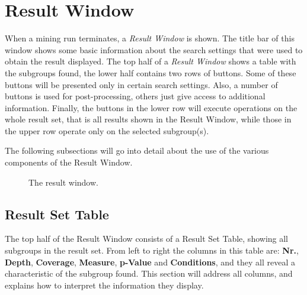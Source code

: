 \documentclass{article}
\begin{document}
\section{Result Window}
\label{section:result-window}
When a mining run terminates, a \emph{Result Window} is shown.
The title bar of this window shows some basic information about the search settings that were used to obtain the result displayed.
The top half of a \emph{Result Window} shows a table with the subgroups found, the lower half contains two rows of buttons.
Some of these buttons will be presented only in certain search settings.
Also, a number of buttons is used for post-processing, others just give access to additional information.
Finally, the buttons in the lower row will execute operations on the whole result set, that is all results shown in the Result Window, while those in the upper row operate only on the selected subgroup(s).

The following subsections will go into detail about the use of the various components of the Result Window.

\begin{figure}
\begin{center}
\centering
{}
\caption{The result window.}
\end{center}
\label{fig:resultwindow}
\end{figure}


\subsection{Result Set Table}
\label{result-window:result-set-table}
The top half of the Result Window consists of a Result Set Table, showing all subgroups in the result set.
From left to right the columns in this table are: \textbf{Nr.}, \textbf{Depth}, \textbf{Coverage}, \textbf{Measure}, \textbf{p-Value} and \textbf{Conditions}, and they all reveal a characteristic of the subgroup found.
This section will address all columns, and explains how to interpret the information they display.
\end{document}

